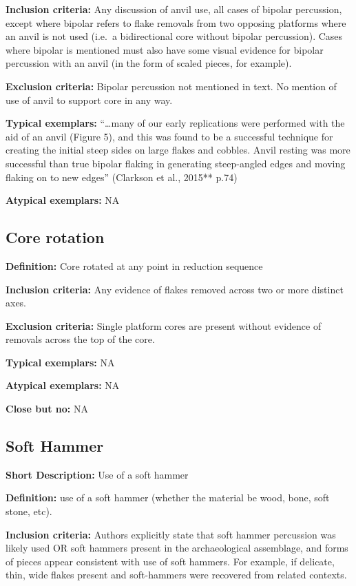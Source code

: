 \documentclass[
]{article}
\begin{document}
\textbf{Inclusion criteria:} Any discussion of anvil use, all cases of
bipolar percussion, except where bipolar refers to flake removals from
two opposing platforms where an anvil is not used (i.e.~a bidirectional
core without bipolar percussion). Cases where bipolar is mentioned must
also have some visual evidence for bipolar percussion with an anvil (in
the form of scaled pieces, for example).

\textbf{Exclusion criteria:} Bipolar percussion not mentioned in text.
No mention of use of anvil to support core in any way.

\textbf{Typical exemplars:} ``\ldots many of our early replications were
performed with the aid of an anvil (Figure 5), and this was found to be
a successful technique for creating the initial steep sides on large
flakes and cobbles. Anvil resting was more successful than true bipolar
flaking in generating steep-angled edges and moving flaking on to new
edges'' (Clarkson et al., 2015** p.74)

\textbf{Atypical exemplars:} NA

\hypertarget{core-rotation}{%
\subsection{Core rotation}\label{core-rotation}}

\textbf{Definition:} Core rotated at any point in reduction sequence

\textbf{Inclusion criteria:} Any evidence of flakes removed across two
or more distinct axes.

\textbf{Exclusion criteria:} Single platform cores are present without
evidence of removals across the top of the core.

\textbf{Typical exemplars:} NA

\textbf{Atypical exemplars:} NA

\textbf{Close but no:} NA

\hypertarget{soft-hammer}{%
\subsection{Soft Hammer}\label{soft-hammer}}

\textbf{Short Description:} Use of a soft hammer

\textbf{Definition:} use of a soft hammer (whether the material be wood,
bone, soft stone, etc).

\textbf{Inclusion criteria:} Authors explicitly state that soft hammer
percussion was likely used OR soft hammers present in the archaeological
assemblage, and forms of pieces appear consistent with use of soft
hammers. For example, if delicate, thin, wide flakes present and
soft-hammers were recovered from related contexts.
\end{document}
